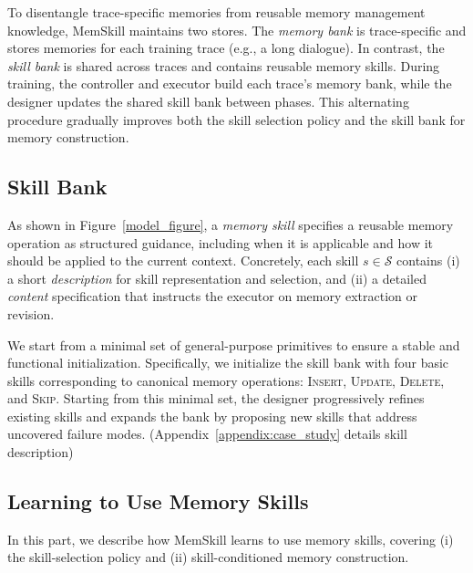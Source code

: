To disentangle trace-specific memories from reusable memory management knowledge, MemSkill maintains two stores. 
The \emph{memory bank} is trace-specific and stores memories for each training trace (e.g., a long dialogue). 
In contrast, the \emph{skill bank} is shared across traces and contains reusable memory skills.
During training, the controller and executor build each trace's memory bank, while the designer updates the shared skill bank between phases. This alternating procedure gradually improves both the skill selection policy and the skill bank for memory construction.




\subsection{Skill Bank}\label{sec:skill_bank}



As shown in Figure~\ref{model_figure}, a \emph{memory skill} specifies a reusable memory operation as structured guidance, including when it is applicable and how it should be applied to the current context. Concretely, each skill $s \in \mathcal{S}$ contains (i) a short \emph{description} for skill representation and selection, and (ii) a detailed \emph{content} specification that instructs the executor on memory extraction or revision.




We start from a minimal set of general-purpose primitives to ensure a stable and functional initialization. Specifically, we initialize the skill bank with four basic skills corresponding to canonical memory operations: \textsc{Insert}, \textsc{Update}, \textsc{Delete}, and \textsc{Skip}. Starting from this minimal set, the designer progressively refines existing skills and expands the bank by proposing new skills that address uncovered failure modes. (Appendix~\ref{appendix:case_study} details skill description)




\subsection{Learning to Use Memory Skills}\label{sec:learn_to_use_skills}

In this part, we describe how MemSkill learns to use memory skills, covering (i) the skill-selection policy and (ii) skill-conditioned memory construction.



